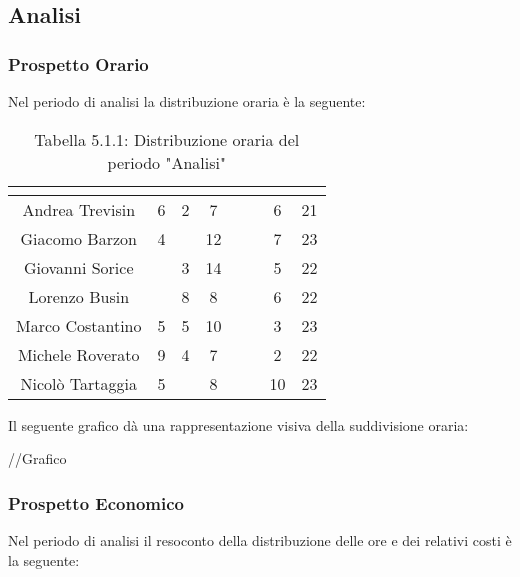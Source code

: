\subsection{Analisi}

\subsubsection{Prospetto Orario}
Nel periodo di analisi la distribuzione oraria è la seguente:

\renewcommand{\arraystretch}{1.5}
\begin{table}[H]
\begin{center}
\begin{tabular}{|c|c|c|c|c|c|c|c|}
\hline
\rowcolor{title_row}
\textbf{\color{title_text}{Nome}} & \textbf{\color{title_text}{Resp.}} & \textbf{\color{title_text}{Ammi.}} & \textbf{\color{title_text}{Analist.}} & \textbf{\color{title_text}{Progett.}} & \textbf{\color{title_text}{Program.}} & \textbf{\color{title_text}{Verific.}} & \textbf{\color{title_text}{Totale}} \\ \hline
Andrea Trevisin  & 6 & 2 & 7 & & & 6 & 21  \\ \hline
Giacomo Barzon   & 4 & & 12 & & & 7 & 23  \\ \hline
Giovanni Sorice  & & 3 & 14 & & & 5 & 22  \\ \hline
Lorenzo Busin    & & 8 & 8 & & & 6 & 22  \\ \hline
Marco Costantino & 5 & 5 & 10 & & & 3 & 23 \\ \hline
Michele Roverato & 9 & 4 & 7 & & & 2 & 22 \\ \hline
Nicolò Tartaggia & 5 & & 8 & & & 10 & 23  \\ \hline
\end{tabular}
\caption{Tabella 5.1.1: Distribuzione oraria del periodo "Analisi"\label{}}
\end{center}
\end{table}
\renewcommand{\arraystretch}{1}

Il seguente grafico dà una rappresentazione visiva della suddivisione oraria: \\
\begin{center}
//Grafico
\end{center}


\subsubsection{Prospetto Economico}
Nel periodo di analisi il resoconto della distribuzione delle ore e dei relativi costi è la seguente:

